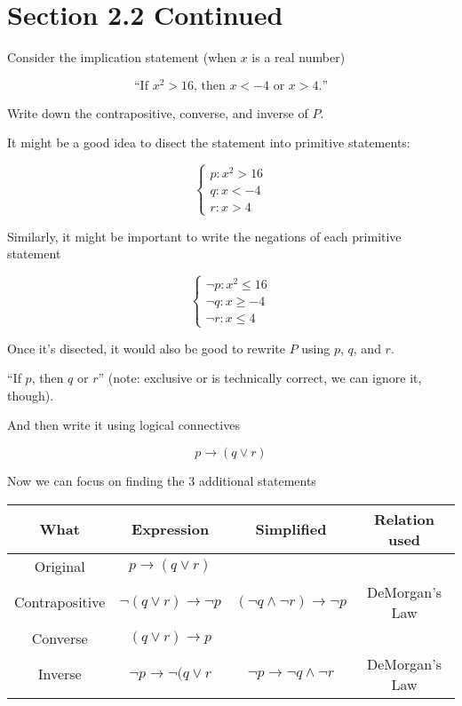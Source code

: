 \documentclass{article}
\begin{document}
\section*{Section 2.2 Continued}

Consider the implication statement (when $x$ is a real number)

\begin{equation}\tag{P}
\text{``If $x^2>16$, then $x<-4$ or $x>4$.''}
\end{equation}

Write down the contrapositive, converse, and inverse of $P$.

It might be a good idea to disect the statement into primitive statements:

\[
\begin{cases}
p: x^2 > 16 \\
q: x<-4 \\
r: x>4
\end{cases}
\]

Similarly, it might be important to write the negations of each primitive statement

\[
\begin{cases}
\neg p: x^2 \le 16 \\
\neg q: x \ge -4 \\
\neg r: x \le 4
\end{cases}
\]

Once it's disected, it would also be good to rewrite $P$ using $p$, $q$, and $r$.

``If $p$, then $q$ or $r$'' (note: exclusive or is technically correct, we can ignore it, though).

And then write it using logical connectives

\[
p\rightarrow (q\vee r)
\]

Now we can focus on finding the 3 additional statements

\begin{tabular}{cccc}
What & Expression & Simplified & Relation used \\
\hline
Original & $p\rightarrow (q\vee r)$ & & \\
Contrapositive & $\neg (q\vee r)\rightarrow \neg p$ & $(\neg q\wedge \neg r)\rightarrow \neg p$ & DeMorgan's Law \\
Converse & $(q \vee r)\rightarrow p$ & & \\
Inverse & $\neg p \rightarrow \neg(q\vee r$ & $\neg p\rightarrow\neg q\wedge\neg r$ & DeMorgan's Law
\end{tabular}
\end{document}
